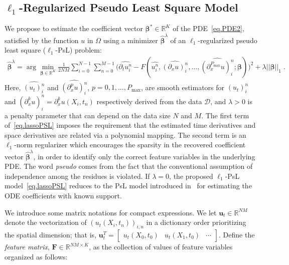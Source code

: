 \documentclass[a4paper,11pt]{article}
\newcommand{\bbeta}{\bm{\beta}}
\begin{document}
 \subsection{$\ell_1$-Regularized Pseudo Least Square Model} 
We propose to estimate the coefficient vector $\bbeta^*\in\mathbb{R}^K$ of the PDE~\eqref{eq.PDE2}, satisfied by the function $u$ in $\Omega$ using a minimizer $\widehat{\bbeta}^\lambda$ of an $\ell_1$-regularized pseudo least square ($\ell_1$-PsL) problem:
\begin{align}
	\widehat{\bbeta}^\lambda = \arg\min_{\bbeta\in\mathbb{R}^K} \frac{1}{2NM}\sum_{i=0}^{N-1}\sum_{n=0}^{M-1} \big(\widehat{\partial_tu_i^n}-F(\widehat{u_i^n},\widehat{(\partial_xu)_i^n},\dots,\widehat{(\partial_x^{P_{\max}}u)_i^n};\bbeta)\big)^2+\lambda||\bbeta||_1\;.\label{eq.lassoPSL}
\end{align}
Here, $\widehat{(u_t)_i^n}$ and $\widehat{(\partial_x^pu)_i^n}$, $p=0,1,\dots,P_{\max}$, are smooth estimators for $(u_t)_i^n$ and $(\partial_x^ku)_i^n=\partial_x^ku(X_i,t_n)$ respectively derived from the data $\mathcal{D}$, and $\lambda>0$ is a penalty parameter that can depend on the data size $N$ and $M$. The first term of~\eqref{eq.lassoPSL} imposes the requirement that the estimated time derivatives and space derivatives are related via a polynomial mapping. The second term is an $\ell_1$-norm regularizer which encourages the sparsity in the recovered coefficient vector $\widehat{\bbeta}^\lambda$, in order to identify only the correct feature variables in the underlying PDE. The word \textit{pseudo} comes from the fact that the conventional assumption of independence among the residues is violated. If $\lambda=0$, the proposed $\ell_1$-PsL model~\eqref{eq.lassoPSL} reduces to the PsL model introduced in~\cite{liang2008parameter} for estimating the ODE coefficients with known support.  

We introduce some matrix notations for compact expressions. We let $\mathbf{u}_t\in\mathbb{R}^{NM}$ denote the vectorization of $(u_t(X_i,t_n))_{i,n}$ in a dictionary order prioritizing the spatial dimension; that is, $\mathbf{u}_t^T=\begin{bmatrix}
u_t(X_0,t_0)&u_t(X_1,t_0)&\cdots	
\end{bmatrix}
$. Define the \textit{feature matrix}, $\mathbf{F}\in\mathbb{R}^{NM\times K}$, as the collection of values of feature variables organized as follows:
\end{document}
